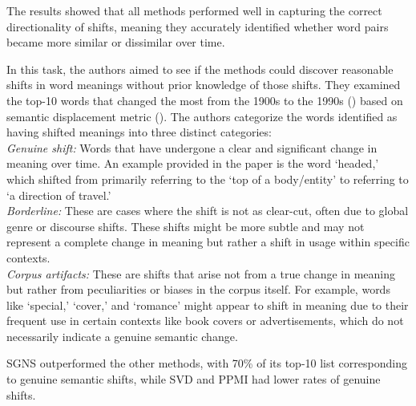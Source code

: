 The results showed that all methods performed well in capturing the correct directionality of shifts, meaning they accurately identified whether word pairs became more similar or dissimilar over time.

In this task, the authors aimed to see if the methods could discover reasonable shifts in word meanings without prior knowledge of those shifts.
They examined the top-10 words that changed the most from the 1900s to the 1990s () based on semantic displacement metric ().
The authors categorize the words identified as having shifted meanings into three distinct categories:\\
\emph{Genuine shift:} Words that have undergone a clear and significant change in meaning over time.
An example provided in the paper is the word `headed,' which shifted from primarily referring to the `top of a body/entity' to referring to `a direction of travel.'\\
\emph{Borderline:} These are cases where the shift is not as clear-cut, often due to global genre or discourse shifts.
These shifts might be more subtle and may not represent a complete change in meaning but rather a shift in usage within specific contexts.\\
\emph{Corpus artifacts:} These are shifts that arise not from a true change in meaning but rather from peculiarities or biases in the corpus itself.
For example, words like `special,' `cover,' and `romance' might appear to shift in meaning due to their frequent use in certain contexts like book covers or advertisements, which do not necessarily indicate a genuine semantic change.

SGNS outperformed the other methods, with 70\% of its top-10 list corresponding to genuine semantic shifts, while SVD and PPMI had lower rates of genuine shifts.

